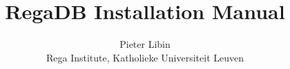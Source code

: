 \documentclass[12pt,makeidx]{phdthesis}
\begin{document}
\title{RegaDB Installation Manual}
\author{Pieter Libin\\Rega Institute, Katholieke Universiteit Leuven}
\maketitle

\cleardoublepage
\lhead[]{\fancyplain{}{\rightmark}}
\chead[\fancyplain{}{}]{\fancyplain{}{}}
\rhead[\fancyplain{}{\leftmark}]{\fancyplain{}{}}

\setcounter{tocdepth}{2}
\tableofcontents

{}
%

\cleardoublepage

\newcommand{\publ}{}

\pagestyle{fancyplain}
\renewcommand{\sectionmark}[1]{\markright{\it \thesection.\ #1}}
\renewcommand{\chaptermark}[1]{\markboth{
       \it \thechapter.\ #1}{}}
\lhead[\thepage]{\fancyplain{\publ}{\rightmark}}
\chead[\fancyplain{}{}]{\fancyplain{}{}}
\rhead[\fancyplain{}{\leftmark}]{\fancyplain{}{\thepage}}
\lfoot[]{}
\cfoot[]{}
\rfoot[]{}








\end{document}
